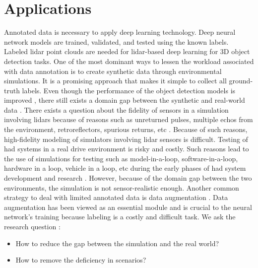 \section{Applications}
Annotated data is necessary to apply deep learning technology. Deep neural network models are trained, validated, and tested using the known labels. Labeled lidar point clouds are needed for lidar-based deep learning for 3D object detection tasks. One of the most dominant ways to lessen the workload associated with data annotation is to create synthetic data through environmental simulations. It is a promising approach that makes it simple to collect all ground-truth labels. Even though the performance of the object detection models is improved \parencite{johnsonroberson2017driving}, there still exists a domain gap between the synthetic and real-world data \parencite{care_real_and_syn_gap}. There exists a question about the fidelity of sensors in a simulation involving lidars because of reasons such as unreturned pulses, multiple echos from the environment, retroreflectors, spurious returns, etc \parencite{zero_domain_gap}. Because of such reasons, high-fidelity modeling of simulators involving lidar sensors is difficult. Testing of \acrshort{had} systems in a real drive environment is risky and costly. Such reasons lead to the use of simulations for testing such as model-in-a-loop, software-in-a-loop, hardware in a loop, vehicle in a loop, etc during the early phases of \acrshort{had} system development and research \parencite{x_in_loop}. However, because of the domain gap between the two environments, the simulation is not sensor-realistic enough. Another common strategy to deal with limited annotated data is data augmentation \parencite{lidar_aug}. Data augmentation has been viewed as an essential module and is crucial to the neural network's training because labeling is a costly and difficult task. We ask the research question : 
\begin{itemize}
    \item How to reduce the gap between the simulation and the real world?
    \item How to remove the deficiency in scenarios?
\end{itemize}


